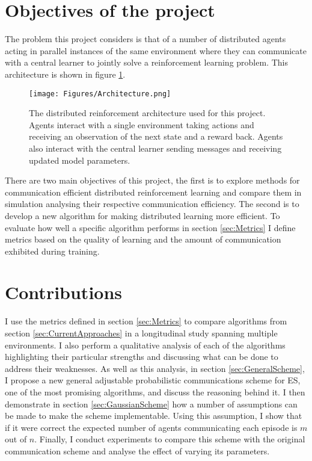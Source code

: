 \section{Objectives of the project}
The problem this project considers is that of a number of distributed agents acting in parallel instances of the same environment where they can communicate with a central learner to jointly solve a reinforcement learning problem. 
This architecture is shown in figure \ref{fig:Architecture}.
\begin{figure}
    \centering
    \texttt{[image: Figures/Architecture.png]}
    \caption{The distributed reinforcement architecture used for this project. Agents interact with a single environment taking actions and receiving an observation of the next state and a reward back. Agents also interact with the central learner sending messages and receiving updated model parameters.}
    \label{fig:Architecture}
\end{figure}
There are two main objectives of this project, the first is to explore methods for communication efficient distributed reinforcement learning and compare them in simulation analysing their respective communication efficiency. The second is to develop a new algorithm for making distributed learning more efficient.
To evaluate how well a specific algorithm performs in section \ref{sec:Metrics} I define metrics based on the quality of learning and the amount of communication exhibited during training.


\section{Contributions}

I use the metrics defined in section \ref{sec:Metrics} to compare algorithms from section \ref{sec:CurrentApproaches} in a longitudinal study spanning multiple environments. 
I also perform a qualitative analysis of each of the algorithms highlighting their particular strengths and discussing what can be done to address their weaknesses.
As well as this analysis, in section \ref{sec:GeneralScheme}, I propose a new general adjustable probabilistic communications scheme for ES, one of the most promising algorithms, and discuss the reasoning behind it. I then demonstrate in section \ref{sec:GaussianScheme} how a number of assumptions can be made to make the scheme implementable.
Using this assumption, I show that if it were correct the expected number of agents communicating each episode is $m$ out of $n$.
Finally, I conduct experiments to compare this scheme with the original communication scheme and analyse the effect of varying its parameters. 

